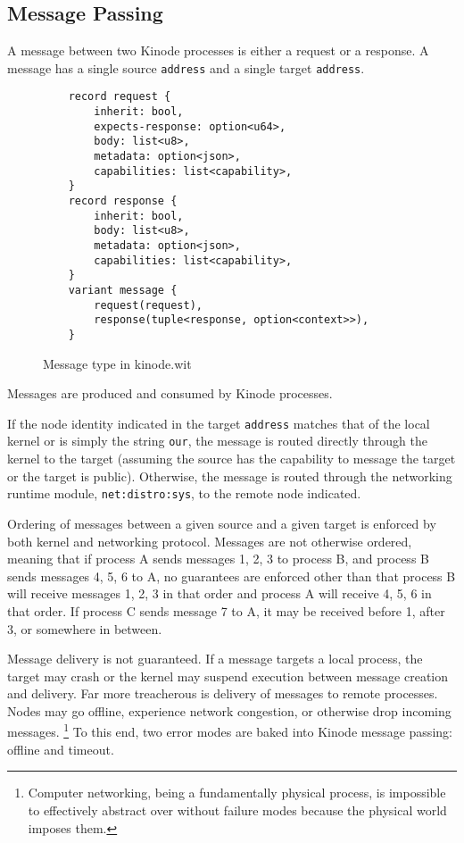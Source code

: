 \documentclass[runningheads]{llncs}
\begin{document}
\subsection{Message Passing}
\label{sec:osmessagepassing}

A message between two Kinode processes is either a request or a response.
A message has a single source \verb|address| and a single target \verb|address|.

\begin{figure}[H]
    \centering
    \begin{verbatim}
    record request {
        inherit: bool,
        expects-response: option<u64>,
        body: list<u8>,
        metadata: option<json>,
        capabilities: list<capability>,
    }
    record response {
        inherit: bool,
        body: list<u8>,
        metadata: option<json>,
        capabilities: list<capability>,
    }
    variant message {
        request(request),
        response(tuple<response, option<context>>),
    }
    \end{verbatim}
    \caption{Message type in kinode.wit}
    \label{fig:WIT Types 2}
\end{figure}

Messages are produced and consumed by Kinode processes.

If the node identity indicated in the target \verb|address| matches that of the local kernel or is simply the string \verb|our|, the message is routed directly through the kernel to the target (assuming the source has the capability to message the target or the target is public).
Otherwise, the message is routed through the networking runtime module, \verb|net:distro:sys|, to the remote node indicated.

Ordering of messages between a given source and a given target is enforced by both kernel and networking protocol.
Messages are not otherwise ordered, meaning that if process A sends messages 1, 2, 3 to process B, and process B sends messages 4, 5, 6 to A, no guarantees are enforced other than that process B will receive messages 1, 2, 3 in that order and process A will receive 4, 5, 6 in that order.
If process C sends message 7 to A, it may be received before 1, after 3, or somewhere in between.

Message delivery is not guaranteed.
If a message targets a local process, the target may crash or the kernel may suspend execution between message creation and delivery.
Far more treacherous is delivery of messages to remote processes.
Nodes may go offline, experience network congestion, or otherwise drop incoming messages.
\footnote{Computer networking, being a fundamentally physical process, is impossible to effectively abstract over without failure modes because the physical world imposes them.}
To this end, two error modes are baked into Kinode message passing: offline and timeout.
\end{document}
